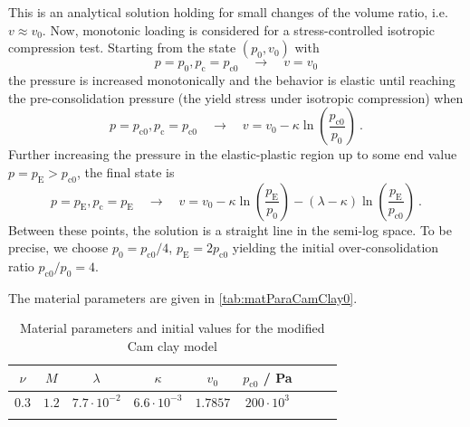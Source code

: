 \documentclass[paper=a4, twoside, pagesize]{scrartcl}
\renewcommand{\c}{\text{c}}
\newcommand{\minus}{-}
\begin{document}
This is an analytical solution holding for small changes of the volume ratio, i.e. $v\approx v_0$.
Now, monotonic loading is considered for a stress-controlled isotropic compression test. Starting from the state $(p_0, v_0)$ with
\begin{equation}
p=p_0, p_\text{c}=p_\text{c0} \quad\rightarrow\quad v = v_0
\end{equation}
the pressure is increased monotonically and the behavior is elastic until reaching the pre-consolidation pressure (the yield stress under isotropic compression) when
\begin{equation}
p=p_\text{c0}, p_\text{c}=p_\text{c0} \quad\rightarrow\quad v = v_0 - \kappa\ln\left(\frac{p_\text{c0}}{p_0}\right) \ .
\end{equation}
Further increasing the pressure in the elastic-plastic region up to some end value $p=p_\text{E}>p_\text{c0}$, the final state is
\begin{equation}
p=p_\text{E}, p_\text{c}=p_\text{E} \quad\rightarrow\quad v = v_0 - \kappa\ln\left(\frac{p_\text{E}}{p_0}\right) - (\lambda-\kappa) \ln\left(\frac{p_\text{E}}{p_\text{c0}}\right) \ .
\end{equation}
Between these points, the solution is a straight line in the semi-log space. To be precise, we choose $p_0 = p_\text{c0} / 4$, $p_\text{E} = 2 p_\text{c0}$ yielding the initial over-consolidation ratio $p_\text{c0}/p_0=4$. 

The material parameters are given in \autoref{tab:matParaCamClay0}.
\begin{table}[h!]
  \centering
  \caption{Material parameters and initial values for the modified Cam clay model}
  \label{tab:matParaCamClay0}
  \begin{tabular}{c c c c c c c | c c}
  \firsthline
    {$\nu$} & {$M$} & {$\lambda$} & {$\kappa$} & {$v_0$} & {$p_{\c0}$} / Pa \\
    \hline
    $0.3$ & $1.2$ & $7.7\cdot 10^{\minus2}$ & $6.6\cdot 10^{\minus3}$ & $1.7857$ & $200\cdot10^{3}$ \\
    \lasthline
  \end{tabular}
\end{table}
\end{document}
